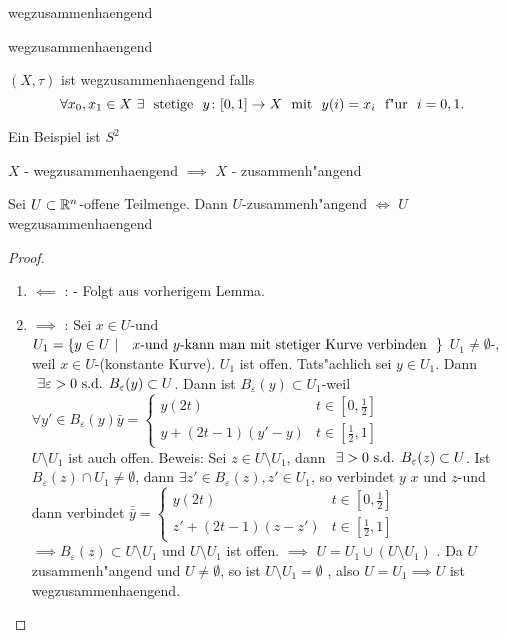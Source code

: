 \documentclass[class=article, crop=false]{standalone}
\begin{document}
\begin{zettel}{wegzusammenhaengend}
\begin{flashcard}[lfefcdxz]{wegzusammenhaengend}
	\begin{definition}
		$(X,\tau)$ ist wegzusammenhaengend falls
		\[
			\forall x_0,x_1 \in  X \exists \tx{ stetige } y \from [0,1] \to X \tx{ mit } y(i)=  x_i \tx{ f"ur } i =  0,1
		.\]
	\end{definition}
\end{flashcard}
\begin{example}
	Ein Beispiel ist $S^2$
\end{example}
\begin{lemma}
	$X$ - wegzusammenhaengend $\implies $ $X$ - zusammenh"angend
\end{lemma}
\begin{lemma}
	Sei $U \subset \mathbb{R}^n$-offene Teilmenge. Dann $U$-zusammenh"angend $\iff $ $U$ wegzusammenhaengend
\end{lemma}
\begin{proof}
	\begin{enumerate}
		\item $\impliedby $ : - Folgt aus vorherigem Lemma.
		\item $\implies $ : Sei $x \in  U$-und $U_1 =\set{y \in  U}{\tx{ $x$-und $y$-kann man mit stetiger Kurve verbinden } }$ $U_1 \neq \emptyset $-, weil $x \in  U$-(konstante Kurve). $U_1$ ist offen. Tats"achlich sei $y \in  U_1$. Dann $\exists \varepsilon > 0 \tx{s.d.} B_{\varepsilon}(y) \subset  U$. Dann ist $B_{\varepsilon}(y) \subset  U_1$-weil $\forall y' \in  B_{\varepsilon}(y) \bar{y} = \begin{cases}
				      y (2t)           & t \in  [0,\frac{1}{2}] \\
				      y + (2t-1)(y'-y) & t \in  [\frac{1}{2},1]
			      \end{cases}$\\

		      $U \setminus U_1$ ist auch offen. Beweis: Sei $z \in  U \setminus  U_1 $, dann $\exists >0 \tx{s.d.} B_{\varepsilon}(z) \subset  U$. Ist $B_{\varepsilon}(z) \cap  U_1 \neq  \emptyset $, dann $\exists  z' \in  B_{\varepsilon}(z), z' \in  U_1$, so verbindet $y$ $x$ und $z$-und dann verbindet $\bar{\bar{y}} = \begin{cases}
				      y(2t)           & t \in [0,\frac{1}{2}]   \\
				      z'+(2t-1)(z-z') & t \in  [\frac{1}{2}, 1]
			      \end{cases}$\\

		      $\implies B_{\varepsilon}(z) \subset U \setminus U_1$ und $U \setminus U_1$ ist offen. $\implies $ $U = U_1 \cup (U \setminus  U_1)$ . Da $U$ zusammenh"angend und $U \neq  \emptyset $, so ist $U \setminus U_1 = \emptyset $ , also $U = U_1 \implies U$ ist wegzusammenhaengend.

	\end{enumerate}
\end{proof}
\end{zettel}
\end{document}
